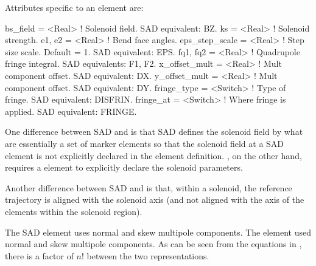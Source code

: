 {
Attributes specific to an  element are:
\begin{example}
  bs_field        = <Real>    ! Solenoid field. SAD equivalent: BZ.
  ks              = <Real>    ! Solenoid strength. 
  e1, e2          = <Real>    ! Bend face angles.
  eps_step_scale  = <Real>    ! Step size scale. Default = 1. SAD equivalent: EPS.
  fq1, fq2        = <Real>    ! Quadrupole fringe integral. SAD equivalents: F1, F2.
  x_offset_mult   = <Real>    ! Mult component offset. SAD equivalent: DX.
  y_offset_mult   = <Real>    ! Mult component offset. SAD equivalent: DY.
  fringe_type     = <Switch>  ! Type of fringe. SAD equivalent: DISFRIN.
  fringe_at       = <Switch>  ! Where fringe is applied. SAD equivalent: FRINGE.
\end{example}


One difference between SAD and \bmad is that SAD defines the solenoid field by what are essentially
a set of marker elements so that the solenoid field at a SAD  element is not explicitly
declared in the  element definition. \bmad, on the other hand, requires a 
element to explicitly declare the solenoid parameters.

Another difference between SAD and \bmad is that, within a solenoid, the reference trajectory is
aligned with the solenoid axis (and not aligned with the axis of the elements within the solenoid
region).

The SAD  element uses normal  and skew  multipole components. The \bmad
{} element used normal  and skew  multipole components. As can be seen from
the equations in , there is a factor of $n!$ between the two representations.

}
